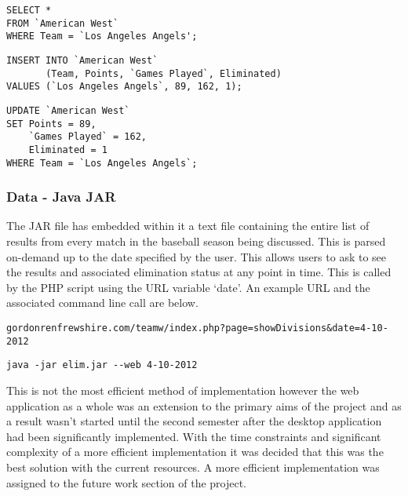 \begin{verbatim}
SELECT *
FROM `American West`
WHERE Team = `Los Angeles Angels';
\end{verbatim}

\begin{verbatim}
INSERT INTO `American West`
       (Team, Points, `Games Played`, Eliminated)
VALUES (`Los Angeles Angels`, 89, 162, 1);
\end{verbatim}

\begin{verbatim}
UPDATE `American West`
SET Points = 89,
    `Games Played` = 162,
    Eliminated = 1
WHERE Team = `Los Angeles Angels`;
\end{verbatim}

\subsubsection{Data - Java JAR}

The JAR file has embedded within it a text file containing the entire list of
results from every match in the baseball season being discussed. This is parsed
on-demand up to the date specified by the user. This allows users to ask to see 
the results and associated elimination status at any point in time. This is
called by the PHP script using the URL variable `date'. An example URL and
the associated command line call are below.

\begin{verbatim}
gordonrenfrewshire.com/teamw/index.php?page=showDivisions&date=4-10-2012
\end{verbatim}

\begin{verbatim}
java -jar elim.jar --web 4-10-2012
\end{verbatim}

This is not 
the most efficient method of implementation however the web application as a 
whole was an extension to the primary aims of the project and as a result wasn't 
started until the second semester after the desktop application had been 
significantly implemented. With the time constraints and significant complexity 
of a more efficient implementation it was decided that this was the best 
solution with the current resources. A more efficient implementation was 
assigned to the future work section of the project.


